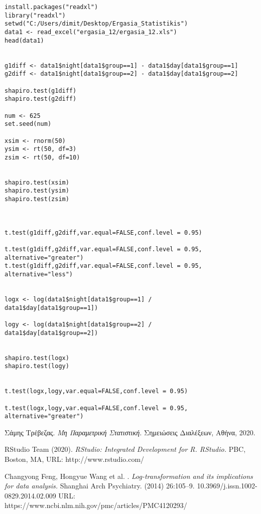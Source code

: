 \documentclass[oneside,a4paper]{article}
\newcommand {\tl}{\textlatin}
\begin{document}
\vspace{0.1cm}
{
\begin{lstlisting}
install.packages("readxl")
library("readxl")
setwd("C:/Users/dimit/Desktop/Ergasia_Statistikis")
data1 <- read_excel("ergasia_12/ergasia_12.xls")
head(data1)


g1diff <- data1$night[data1$group==1] - data1$day[data1$group==1]
g2diff <- data1$night[data1$group==2] - data1$day[data1$group==2]

shapiro.test(g1diff)
shapiro.test(g2diff)

num <- 625
set.seed(num)

xsim <- rnorm(50)
ysim <- rt(50, df=3)
zsim <- rt(50, df=10)


shapiro.test(xsim)
shapiro.test(ysim)
shapiro.test(zsim)



t.test(g1diff,g2diff,var.equal=FALSE,conf.level = 0.95)

t.test(g1diff,g2diff,var.equal=FALSE,conf.level = 0.95,
alternative="greater")
t.test(g1diff,g2diff,var.equal=FALSE,conf.level = 0.95,
alternative="less")


logx <- log(data1$night[data1$group==1] / 
data1$day[data1$group==1])

logy <- log(data1$night[data1$group==2] /
data1$day[data1$group==2])


shapiro.test(logx)
shapiro.test(logy)


t.test(logx,logy,var.equal=FALSE,conf.level = 0.95)

t.test(logx,logy,var.equal=FALSE,conf.level = 0.95,
alternative="greater")
\end{lstlisting}}
\pagebreak
\begin{thebibliography}{9}
    \vspace{1cm}
	Σάμης Τρέβεζας.
	\textit{Μη Παραμετρική Στατιστική.}
	Σημειώσεις Διαλέξεων, Αθήνα, 2020.

	\tl{RStudio Team (2020).}
	\textit{\tl{RStudio: Integrated Development for R. RStudio.}}
	\tl{PBC, Boston, MA, URL: http://www.rstudio.com/}

	\tl{ Changyong Feng, Hongyue Wang et al. .}
    \textit{\tl{Log-transformation and its implications for data analysis.}}
    \tl{Shanghai Arch Psychiatry. (2014) 26:105–9. 10.3969/j.issn.1002-0829.2014.02.009}
    \tl{URL: https://www.ncbi.nlm.nih.gov/pmc/articles/PMC4120293/}
\end{thebibliography}
\end{document}
